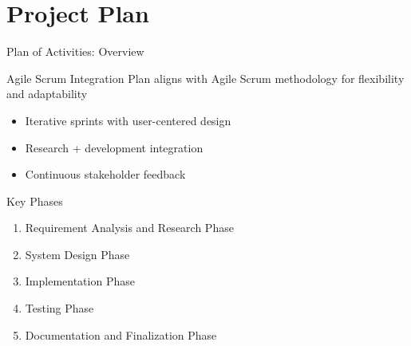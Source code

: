 \section{Project Plan}

\begin{frame}{Plan of Activities: Overview}
    \begin{block}{Agile Scrum Integration}
        Plan aligns with Agile Scrum methodology for flexibility and adaptability
        \begin{itemize}
            \item Iterative sprints with user-centered design
            \item Research + development integration
            \item Continuous stakeholder feedback
        \end{itemize}
    \end{block}
    
    \begin{block}{Key Phases}
        \begin{enumerate}
            \item Requirement Analysis and Research Phase
            \item System Design Phase
            \item Implementation Phase
            \item Testing Phase
            \item Documentation and Finalization Phase
        \end{enumerate}
    \end{block}
\end{frame}

